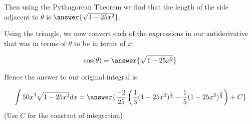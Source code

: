 \documentclass{ximera}
\begin{document}
\begin{exercise}
\begin{exercise}
\begin{exercise}
Then using the Pythagorean Theorem we find that the
 length of the side adjacent to $\theta$ is $\answer{\sqrt{1-25x^{2}}}$. 

Using the triangle, we now convert each of the expressions in our antiderivative that was in terms of $\theta$ to be in terms of $x$:

\[
\cos(\theta)=\answer{\sqrt{1-25x^{2}}}
\]

\begin{exercise}
Hence the answer to our original integral is: 

\[
\int 50 x^{3} \sqrt{1-25x^{2}}  dx= \answer{ \frac{-2}{25} \left( \frac{1}{3}(1-25x^{2})^{\frac{3}{2}} - \frac{1}{5}(1-25x^{2})^{\frac{5}{2}}\right) + C }
\]
(Use $C$ for the constant of integration)





\end{exercise}
\end{exercise}

\end{exercise}

\end{exercise}
\end{document}
